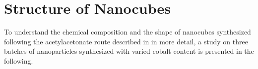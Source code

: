 \documentclass[\main/dresen_thesis.tex]{subfiles}
\begin{document}
\chapter{Structure of  Nanocubes}\label{app:structureCoFe2O4Nanocubes}
  To understand the chemical composition and the shape of nanocubes synthesized following the acetylacetonate route described in  in more detail, a study on three batches of nanoparticles synthesized with varied cobalt content is presented in the following.
\end{document}
